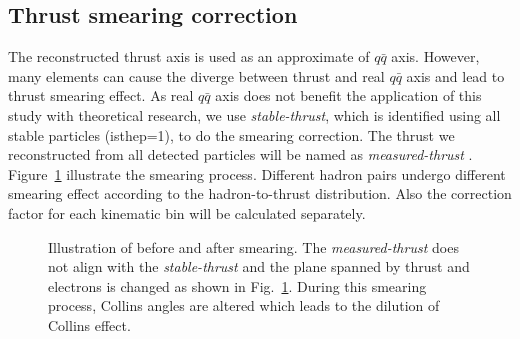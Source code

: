 \subsection{\texorpdfstring{Thrust smearing correction}{Thrust smearing correction}}
\label{sec:smearingcorrection}
The reconstructed thrust axis is used as an approximate of $q\bar{q}$ axis. However, many elements can cause the diverge between thrust and real $q\bar{q}$ axis and lead to thrust smearing effect. As real $q\bar{q}$ axis does not benefit the application of this study with theoretical research, we use {\em stable-thrust}, which is identified using all stable particles (isthep=1), to do the smearing correction. The thrust we reconstructed from all detected particles will be named as {\em measured-thrust} . Figure~\ref{fig:SmearIllustr} illustrate the smearing process. Different hadron pairs undergo different smearing effect according to the hadron-to-thrust distribution. Also the correction factor for each kinematic bin will be calculated separately.%

\begin{figure}[H]
  \centering     
  \caption{Illustration of before and after smearing. The {\em measured-thrust} does not align with the {\em stable-thrust} and the plane spanned by thrust and electrons is changed as shown in Fig.~\ref{fig:SmearIllustr}. During this smearing process, Collins angles are altered which leads to the dilution of Collins effect.}
  \label{fig:SmearIllustr}
\end{figure}

